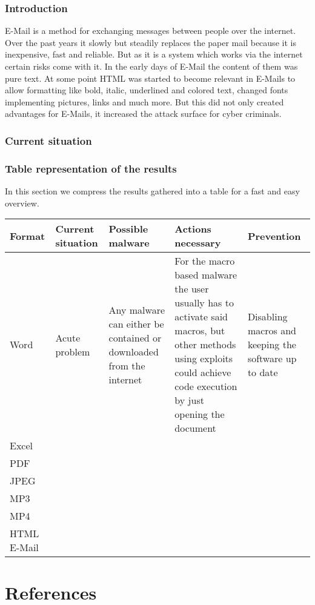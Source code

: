 \documentclass[a4paper,10pt]{article}
\begin{document}
\subsubsection{Introduction}
E-Mail is a method for exchanging messages between people over the internet. Over the past years it slowly but steadily replaces the paper mail because it is inexpensive, fast and reliable. But as it is a system which works via the internet certain risks come with it. In the early days of E-Mail the content of them was pure text. At some point HTML was started to become relevant in E-Mails to allow formatting like bold, italic, underlined and colored text, changed fonts implementing pictures, links and much more. But this did not only created advantages for E-Mails, it increased the attack surface for cyber criminals.

\subsubsection{Current situation}












\subsubsection{Table representation of the results}

In this section we compress the results gathered into a table for a fast and easy overview.
\begin{footnotesize}
\begin{center}
\begin{tabularx}{\textwidth}{X|X|X|X|X}
Format & Current situation & Possible malware & Actions necessary & Prevention\\
\hline
Word & Acute problem & Any malware can either be contained or downloaded from the internet & For the macro based malware the user usually has to activate said macros, but other methods using exploits could achieve code execution by just opening the document & Disabling macros and keeping the software up to date\\
\hline
Excel & \\
\hline
PDF & \\
\hline
JPEG & \\
\hline
MP3 & \\
\hline
MP4 & \\
\hline
HTML E-Mail & \\


\end{tabularx}
\end{center}

\end{footnotesize}



\newpage
\section{References}


\end{document}
